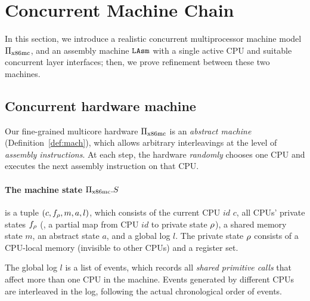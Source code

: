 \newcommand{\PBoot}{\mathsf{PBoot}}
\newcommand{\XAsm}{\mathsf{XAsm}}

\section{Concurrent Machine Chain}
\label{sec:mach}


In this section, we introduce a realistic
concurrent multiprocessor machine model $\Pi_{\text{x86mc}}$,
and an assembly machine ${\texttt{LAsm}}$ with a single active CPU
and suitable concurrent layer interfaces; then, we prove
refinement between these two machines.

\subsection{Concurrent hardware machine}
Our fine-grained multicore hardware $\Pi_{\text{x86mc}}$
is an \emph{abstract machine} (\cf Definition~\ref{def:mach}),
which allows arbitrary
interleavings at the level of \emph{assembly instructions}.
At each step, the hardware \emph{randomly} chooses one CPU 
and executes the next assembly instruction on that CPU.


\paragraph{The machine state $\Pi_{\text{x86mc}}.S$} is a tuple $(c, f_\rho, m, a, l)$,
which consists of 
the current CPU $id$ $c$,
all CPUs' private states $f_\rho$
(\ie, a partial map from CPU $id$ to private state $\rho$),
a shared memory state $m$,
an abstract state $a$, and a global log $l$.
The private state $\rho$ consists of a CPU-local memory
(invisible to other CPUs) and a register set.

The global log $l$ 
is a list of events, which records all \emph{shared primitive calls} that affect more than
one CPU in the machine. Events generated by different CPUs are
interleaved in the log, following the actual chronological order of events.

